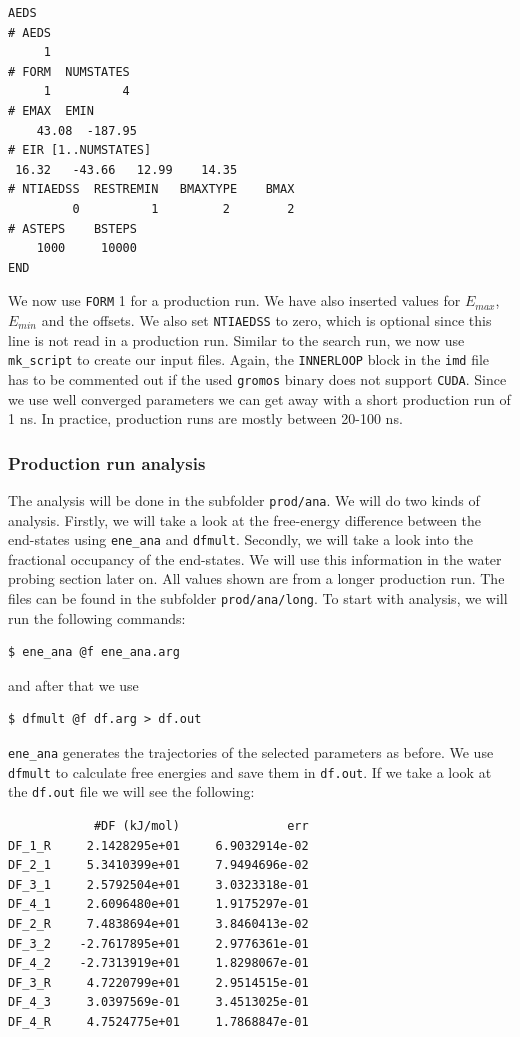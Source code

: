 \begin{lstlisting}
AEDS
# AEDS
     1
# FORM  NUMSTATES
     1          4
# EMAX  EMIN
    43.08  -187.95
# EIR [1..NUMSTATES]
 16.32   -43.66   12.99    14.35 
# NTIAEDSS  RESTREMIN   BMAXTYPE    BMAX   
         0          1         2        2      
# ASTEPS    BSTEPS
    1000     10000 
END
\end{lstlisting}

We now use \texttt{FORM} 1 for a production run. We have also inserted values for $E_{max}$, $E_{min}$ and the offsets. We also set \texttt{NTIAEDSS} to zero, which is optional since this line is not read in a production run. Similar to the search run, we now use \texttt{mk\_script} to create our input files. Again, the \texttt{INNERLOOP} block in the \texttt{imd} file has to be commented out if the used \texttt{gromos} binary does not support \texttt{CUDA}.
Since we use well converged parameters we can get away with a short production run of 1 ns. In practice, production runs are mostly between 20-100 ns.

\subsubsection{Production run analysis}
The analysis will be done in the subfolder \texttt{prod/ana}. We will do two kinds of analysis. Firstly, we will take a look at the free-energy difference between the end-states using \texttt{ene\_ana} and \texttt{dfmult}. Secondly, we will take a look into the fractional occupancy of the end-states. We will use this information in the water probing section later on. All values shown are from a longer production run. The files can be found in the subfolder \texttt{prod/ana/long}. To start with analysis, we will run the following commands:

\begin{lstlisting}
$ ene_ana @f ene_ana.arg
\end{lstlisting}

and after that we use

\begin{lstlisting}
$ dfmult @f df.arg > df.out
\end{lstlisting}

\texttt{ene\_ana} generates the trajectories of the selected parameters as before. We use \texttt{dfmult} to calculate free energies and save them in \texttt{df.out}. If we take a look at the \texttt{df.out} file we will see the following:

\begin{lstlisting}
            #DF (kJ/mol)               err
DF_1_R     2.1428295e+01     6.9032914e-02
DF_2_1     5.3410399e+01     7.9494696e-02
DF_3_1     2.5792504e+01     3.0323318e-01
DF_4_1     2.6096480e+01     1.9175297e-01
DF_2_R     7.4838694e+01     3.8460413e-02
DF_3_2    -2.7617895e+01     2.9776361e-01
DF_4_2    -2.7313919e+01     1.8298067e-01
DF_3_R     4.7220799e+01     2.9514515e-01
DF_4_3     3.0397569e-01     3.4513025e-01
DF_4_R     4.7524775e+01     1.7868847e-01
\end{lstlisting}

